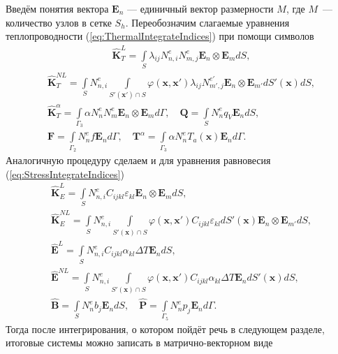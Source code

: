 Введём понятия вектора $\boldsymbol{E}_n$ --- единичный вектор размерности $M$, где $M$~--- количество узлов в сетке $S_h$. Переобозначим слагаемые уравнения теплопроводности (\ref{eq:ThermalIntegrateIndices}) при помощи символов
\begin{gather*}
	\widehat{\textbf{K}}^L_T = 
	\int\limits_S
	\lambda_{ij} N_{n, i}^{e} N_{m, j}^{e}
	\boldsymbol{E}_n \otimes \boldsymbol{E}_m dS,
\end{gather*}
\begin{gather*}
	\widehat{\textbf{K}}^{NL}_T =
	\int\limits_S
	N_{n, i}^{e}
	\int\limits_{S'(\boldsymbol{x}') \cap S}
	\varphi( \boldsymbol{x}, \boldsymbol{x}' )
	\lambda_{ij}
	N_{m', j}^{e'} \boldsymbol{E}_n \otimes \boldsymbol{E}_{m'} dS'(\boldsymbol{x}) dS, \\
	\widehat{\textbf{K}}^{\alpha}_T = \int\limits_{\Gamma_3} \alpha N_n^{e} N_m^{e} \boldsymbol{E}_n \otimes \boldsymbol{E}_{m} d\Gamma, 
	\quad
	\textbf{Q} = \int\limits_S N_n^{e} q_V \boldsymbol{E}_n dS, \\
	\textbf{F} = \int\limits_{\Gamma_2} N_n^{e} f \boldsymbol{E}_n d\Gamma,
	\quad
	\textbf{T}^{\alpha} = \int\limits_{\Gamma_3} \alpha N_n^{e} T_a(\boldsymbol{x}) \boldsymbol{E}_n d\Gamma.
\end{gather*}
Аналогичную процедуру сделаем и для уравнения равновесия (\ref{eq:StressIntegrateIndices})
\begin{gather*}
	\widehat{\textbf{K}}^L_E = \int\limits_S N_{n,i}^{e} C_{ijkl} \varepsilon_{kl} \boldsymbol{E}_n \otimes \boldsymbol{E}_{m} dS, \\
	\widehat{\textbf{K}}^{NL}_E = \int\limits_S N_{n, i}^{e} \int\limits_{S'(\boldsymbol{x}) \cap S}
	\varphi(\boldsymbol{x}, \boldsymbol{x}') C_{ijkl} \varepsilon_{kl} dS'(\boldsymbol{x}) \boldsymbol{E}_n \otimes \boldsymbol{E}_{m'} dS,
	\\
	\widehat{\textbf{E}}^L = \int\limits_S N_{n,i}^{e} C_{ijkl} \alpha_{kl} \Delta T \boldsymbol{E}_n dS,
	\\
	\widehat{\textbf{E}}^{NL} = \int\limits_S N_{n,i}^{e}
	\int\limits_{S'(\boldsymbol{x}) \cap S} 
	\varphi(\boldsymbol{x}, \boldsymbol{x}')
	C_{ijkl} \alpha_{kl} \Delta T \boldsymbol{E}_n dS'(\boldsymbol{x}) dS,
	\\
	\widehat{\textbf{B}} = \int\limits_S N_n^{e} b_j \boldsymbol{E}_n dS,
	\quad 
	\widehat{\textbf{P}} = \int\limits_{\Gamma_5} N_n^{e} p_j \boldsymbol{E}_n d\Gamma.
\end{gather*}
Тогда после интегрирования, о котором пойдёт речь в следующем разделе, итоговые системы можно записать в матрично-векторном виде
